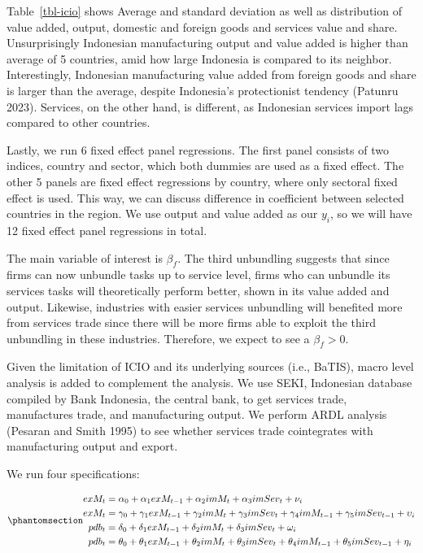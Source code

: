\documentclass[
  letterpaper,
  DIV=11,
  numbers=noendperiod]{scrartcl}
\begin{document}
Table~\ref{tbl-icio} shows Average and standard deviation as well as
distribution of value added, output, domestic and foreign goods and
services value and share. Unsurprisingly Indonesian manufacturing output
and value added is higher than average of 5 countries, amid how large
Indonesia is compared to its neighbor. Interestingly, Indonesian
manufacturing value added from foreign goods and share is larger than
the average, despite Indonesia's protectionist tendency (Patunru 2023).
Services, on the other hand, is different, as Indonesian services import
lags compared to other countries.

Lastly, we run 6 fixed effect panel regressions. The first panel
consists of two indices, country and sector, which both dummies are used
as a fixed effect. The other 5 panels are fixed effect regressions by
country, where only sectoral fixed effect is used. This way, we can
discuss difference in coefficient between selected countries in the
region. We use output and value added as our \(y_i\), so we will have 12
fixed effect panel regressions in total.

The main variable of interest is \(\beta_f\). The third unbundling
suggests that since firms can now unbundle tasks up to service level,
firms who can unbundle its services tasks will theoretically perform
better, shown in its value added and output. Likewise, industries with
easier services unbundling will benefited more from services trade since
there will be more firms able to exploit the third unbundling in these
industries. Therefore, we expect to see a \(\beta_f>0\).

Given the limitation of ICIO and its underlying sources (i.e., BaTIS),
macro level analysis is added to complement the analysis. We use SEKI,
Indonesian database compiled by Bank Indonesia, the central bank, to get
services trade, manufactures trade, and manufacturing output. We perform
ARDL analysis (Pesaran and Smith 1995) to see whether services trade
cointegrates with manufacturing output and export.

We run four specifications:

\begin{equation}\phantomsection\label{eq-3}{
\begin{align}
exM_t&=\alpha_0+\alpha_1 exM_{t-1}+\alpha_2 imM_t+\alpha_3 imSev_t+\nu_i \\
exM_t&=\gamma_0+\gamma_1 exM_{t-1}+\gamma_2 imM_t+\gamma_3 imSev_t+ \gamma_4 imM_{t-1}+\gamma_5 imSev_{t-1}+\upsilon_i \\
pdb_t&=\delta_0+\delta_1 exM_{t-1}+\delta_2 imM_t+\delta_3 imSev_t+\omega_i \\
pdb_t&=\theta_0+\theta_1 exM_{t-1}+\theta_2 imM_t+\theta_3 imSev_t+ \theta_4 imM_{t-1}+\theta_5 imSev_{t-1}+\eta_i
\end{align}
}\end{equation}
\end{document}
